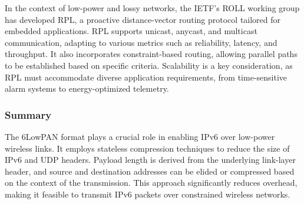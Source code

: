 In the context of low-power and lossy networks, the IETF's ROLL working group has developed RPL, a proactive distance-vector routing protocol tailored for embedded applications. 
RPL supports unicast, anycast, and multicast communication, adapting to various metrics such as reliability, latency, and throughput. 
It also incorporates constraint-based routing, allowing parallel paths to be established based on specific criteria. 
Scalability is a key consideration, as RPL must accommodate diverse application requirements, from time-sensitive alarm systems to energy-optimized telemetry.

\subsubsection{Summary}
The 6LowPAN format plays a crucial role in enabling IPv6 over low-power wireless links. 
It employs stateless compression techniques to reduce the size of IPv6 and UDP headers. 
Payload length is derived from the underlying link-layer header, and source and destination addresses can be elided or compressed based on the context of the transmission. 
This approach significantly reduces overhead, making it feasible to transmit IPv6 packets over constrained wireless networks.